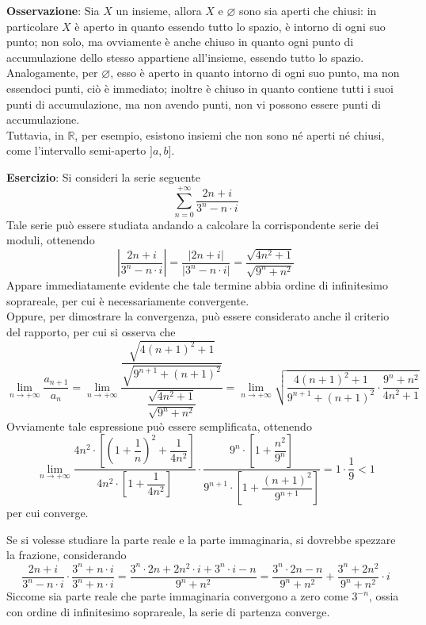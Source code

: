 \documentclass[a4paper]{extarticle}
\begin{document}
\vspace{2em}
\noindent
\textbf{Osservazione}: Sia $X$ un insieme, allora $X$ e $\varnothing$ sono sia aperti che chiusi: in particolare $X$ è aperto in quanto essendo tutto lo spazio, è intorno di ogni suo punto; non solo, ma ovviamente è anche chiuso in quanto ogni punto di accumulazione dello stesso appartiene all'insieme, essendo tutto lo spazio. Analogamente, per $\varnothing$, esso è aperto in quanto intorno di ogni suo punto, ma non essendoci punti, ciò è immediato; inoltre è chiuso in quanto contiene tutti i suoi punti di accumulazione, ma non avendo punti, non vi possono essere punti di accumulazione.\\
Tuttavia, in $\mathbb{R}$, per esempio, esistono insiemi che non sono né aperti né chiusi, come l'intervallo semi-aperto $]a,b]$.

\vspace{1em}
\noindent
\textbf{Esercizio}: Si consideri la serie seguente
\[\sum_{n=0}^{+\infty} \frac{2n+i}{3^n-n \cdot i}\]
Tale serie può essere studiata andando a calcolare la corrispondente serie dei moduli, ottenendo
\[\left \vert \frac{2n+i}{3^n-n \cdot i} \right \vert = \frac{\vert 2n+i \vert}{\vert 3^n-n \cdot i \vert} = \frac{\sqrt{4n^2+1}}{\sqrt{9^n+n^2}}\]
Appare immediatamente evidente che tale termine abbia ordine di infinitesimo soprareale, per cui è necessariamente convergente.\\
Oppure, per dimostrare la convergenza, può essere considerato anche il criterio del rapporto, per cui si osserva che
\[\lim_{n \to +\infty} \dfrac{a_{n+1}}{a_n} = \lim_{n \to +\infty} \dfrac{\dfrac{\sqrt{4(n+1)^2+1}}{\sqrt{9^{n+1}+(n+1)^2}}}{\dfrac{\sqrt{4n^2+1}}{\sqrt{9^n+n^2}}} = \lim_{n \to +\infty} \sqrt{\dfrac{4(n+1)^2+1}{9^{n+1}+(n+1)^2} \cdot \dfrac{9^n+n^2}{4n^2+1}}\]
Ovviamente tale espressione può essere semplificata, ottenendo
\[\lim_{n \to +\infty} \dfrac{4n^2 \cdot \left[\left(1+\dfrac{1}{n}\right)^2 + \dfrac{1}{4n^2} \right]}{4n^2 \cdot \left[1+\dfrac{1}{4n^2}\right]} \cdot \dfrac{9^n \cdot \left[1+\dfrac{n^2}{9^n}\right]}{9^{n+1} \cdot \left[1+\dfrac{(n+1)^2}{9^{n+1}}\right]} = 1 \cdot \dfrac{1}{9} < 1\]
per cui converge.

\vspace{1em}
\noindent
Se si volesse studiare la parte reale e la parte immaginaria, si dovrebbe spezzare la frazione, considerando
\[\frac{2n+i}{3^n-n \cdot i} \cdot \dfrac{3^n+n \cdot i}{3^n + n \cdot i} = \dfrac{3^n \cdot 2n + 2n^2 \cdot i + 3^n \cdot i - n}{9^n + n^2} = \dfrac{3^n \cdot 2n - n}{9^n + n^2} + \dfrac{3^n + 2n^2}{9^n + n^2} \cdot i\]
Siccome sia parte reale che parte immaginaria convergono a zero come $3^{-n}$, ossia con ordine di infinitesimo soprareale, la serie di partenza converge.
\end{document}
